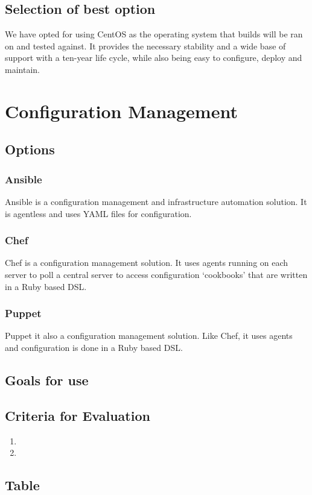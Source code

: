 \documentclass[10pt,letterpaper,onecolumn,journal]{IEEEtran}
\begin{document}
\subsection{Selection of best option}
We have opted for using CentOS as the operating system that builds will be ran on and tested against. It provides the necessary stability and a wide base of support with a ten-year life cycle, while also being easy to configure, deploy and maintain.

\section{Configuration Management}
\subsection{Options}
\subsubsection{Ansible}
Ansible is a configuration management and infrastructure automation solution.
It is agentless and uses YAML files for configuration.  
\subsubsection{Chef}
Chef is a configuration management solution.
It uses agents running on each server to poll a central server to access configuration `cookbooks' that are written in a Ruby based DSL\@.
\subsubsection{Puppet}
Puppet it also a configuration management solution.
Like Chef, it uses agents and configuration is done in a Ruby based DSL\@.
\subsection{Goals for use}
\subsection{Criteria for Evaluation}
\begin{enumerate}
  \item
  \item
\end{enumerate}
\subsection{Table}
\end{document}

